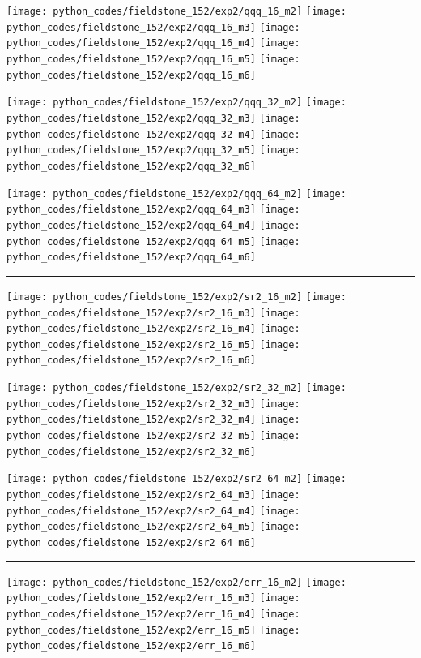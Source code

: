 \noindent
\texttt{[image: python\_codes/fieldstone\_152/exp2/qqq\_16\_m2]}
\texttt{[image: python\_codes/fieldstone\_152/exp2/qqq\_16\_m3]}
\texttt{[image: python\_codes/fieldstone\_152/exp2/qqq\_16\_m4]}
\texttt{[image: python\_codes/fieldstone\_152/exp2/qqq\_16\_m5]}
\texttt{[image: python\_codes/fieldstone\_152/exp2/qqq\_16\_m6]}

\noindent
\texttt{[image: python\_codes/fieldstone\_152/exp2/qqq\_32\_m2]}
\texttt{[image: python\_codes/fieldstone\_152/exp2/qqq\_32\_m3]}
\texttt{[image: python\_codes/fieldstone\_152/exp2/qqq\_32\_m4]}
\texttt{[image: python\_codes/fieldstone\_152/exp2/qqq\_32\_m5]}
\texttt{[image: python\_codes/fieldstone\_152/exp2/qqq\_32\_m6]}

\noindent
\texttt{[image: python\_codes/fieldstone\_152/exp2/qqq\_64\_m2]}
\texttt{[image: python\_codes/fieldstone\_152/exp2/qqq\_64\_m3]}
\texttt{[image: python\_codes/fieldstone\_152/exp2/qqq\_64\_m4]}
\texttt{[image: python\_codes/fieldstone\_152/exp2/qqq\_64\_m5]}
\texttt{[image: python\_codes/fieldstone\_152/exp2/qqq\_64\_m6]}

\hrule

\noindent
\texttt{[image: python\_codes/fieldstone\_152/exp2/sr2\_16\_m2]}
\texttt{[image: python\_codes/fieldstone\_152/exp2/sr2\_16\_m3]}
\texttt{[image: python\_codes/fieldstone\_152/exp2/sr2\_16\_m4]}
\texttt{[image: python\_codes/fieldstone\_152/exp2/sr2\_16\_m5]}
\texttt{[image: python\_codes/fieldstone\_152/exp2/sr2\_16\_m6]}

\noindent
\texttt{[image: python\_codes/fieldstone\_152/exp2/sr2\_32\_m2]}
\texttt{[image: python\_codes/fieldstone\_152/exp2/sr2\_32\_m3]}
\texttt{[image: python\_codes/fieldstone\_152/exp2/sr2\_32\_m4]}
\texttt{[image: python\_codes/fieldstone\_152/exp2/sr2\_32\_m5]}
\texttt{[image: python\_codes/fieldstone\_152/exp2/sr2\_32\_m6]}

\noindent
\texttt{[image: python\_codes/fieldstone\_152/exp2/sr2\_64\_m2]}
\texttt{[image: python\_codes/fieldstone\_152/exp2/sr2\_64\_m3]}
\texttt{[image: python\_codes/fieldstone\_152/exp2/sr2\_64\_m4]}
\texttt{[image: python\_codes/fieldstone\_152/exp2/sr2\_64\_m5]}
\texttt{[image: python\_codes/fieldstone\_152/exp2/sr2\_64\_m6]}

\hrule

\noindent
\texttt{[image: python\_codes/fieldstone\_152/exp2/err\_16\_m2]}
\texttt{[image: python\_codes/fieldstone\_152/exp2/err\_16\_m3]}
\texttt{[image: python\_codes/fieldstone\_152/exp2/err\_16\_m4]}
\texttt{[image: python\_codes/fieldstone\_152/exp2/err\_16\_m5]}
\texttt{[image: python\_codes/fieldstone\_152/exp2/err\_16\_m6]}

